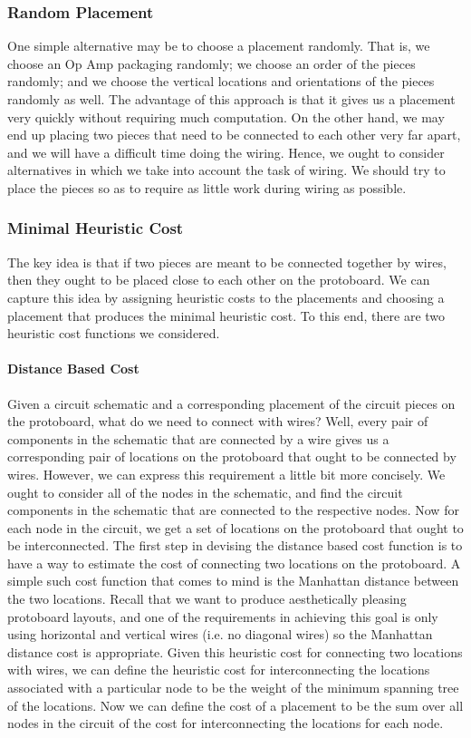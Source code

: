 \subsubsection{Random Placement}

One simple alternative may be to choose a placement randomly. That is, we choose
an Op Amp packaging randomly; we choose an order of the pieces randomly; and we
choose the vertical locations and orientations of the pieces randomly as well.
The advantage of this
approach is that it gives us a placement very quickly without requiring much
computation. On the other hand, we may end up placing two pieces that need to be
connected to each other very far apart, and we will have a difficult time doing
the wiring. Hence, we ought to consider alternatives in which we take into
account the task of wiring. We should try to place the pieces so as to require
as little work during wiring as possible.

\subsubsection{Minimal Heuristic Cost}

The key idea is that if two pieces are meant to be connected together by wires,
then they ought to be placed close to each other on the protoboard. We can
capture this idea by assigning heuristic costs to the placements and choosing
a placement that produces the minimal heuristic cost. To this end, there are two
heuristic cost functions we considered.

\paragraph{Distance Based Cost}
Given a circuit
schematic and a corresponding placement of the circuit pieces on the protoboard,
what do we need to connect with wires? Well, every pair of components in the
schematic that are connected by a wire gives us a corresponding pair of
locations on the protoboard that ought to be connected by wires. However, we can
express this requirement a little bit more concisely. We ought to consider all
of the nodes in the schematic, and find the circuit components in the schematic
that are connected to the respective nodes. Now for each node in the circuit, we
get a set of locations on the protoboard that ought to be interconnected. The
first step in devising the distance based cost function is to have a way to
estimate the cost of connecting two locations on the protoboard. A simple such
cost function that comes to mind is the Manhattan distance between the two
locations. Recall that we want to produce aesthetically pleasing protoboard
layouts, and one of the requirements in achieving this goal is only using
horizontal and vertical wires (i.e. no diagonal wires) so the Manhattan distance
cost is appropriate. Given this heuristic cost for connecting two locations with
wires, we can define the heuristic cost for interconnecting the locations
associated with a particular node to be the weight of the minimum spanning tree
of the locations. Now we can define the cost of a placement to be the sum over
all nodes in the circuit of the cost for interconnecting the locations for each
node.

